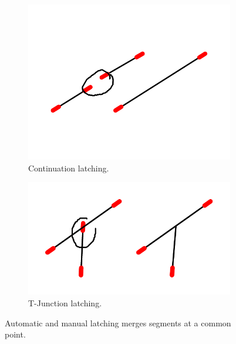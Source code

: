 \begin{figure}
  \vspace{5mm}
  \begin{subfigure}[t]{0.45\textwidth}
    \centering
    \includegraphics[width=0.6\linewidth]{img/latch-manual-continuation.pdf}
    \caption{Continuation latching.}
    \label{fig:latch-continuation}
  \end{subfigure}
  \begin{subfigure}[t]{0.45\textwidth}
    \centering
    \includegraphics[width=0.6\linewidth]{img/latch-manual-tjunct.pdf}
    \caption{T-Junction latching.}
    \label{fig:latch-tjunct}
  \end{subfigure}
  \caption[Four kinds of latching]{Automatic and manual latching
    merges segments at a common point.}
  \label{fig:latch}
\end{figure}



